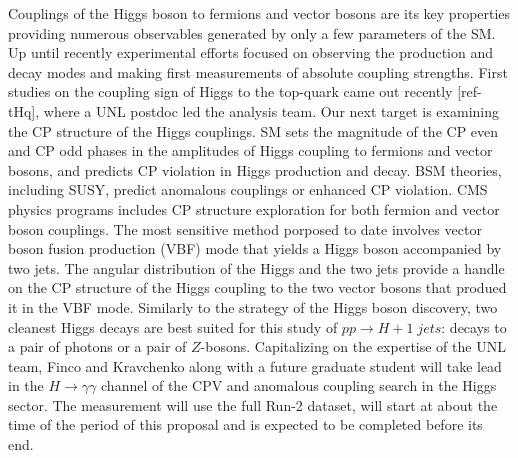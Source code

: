 Couplings of the Higgs boson to fermions and vector bosons are its key properties providing numerous observables generated by only a few parameters of the SM. Up until recently experimental efforts focused on observing the production and decay modes and making first measurements of absolute coupling strengths. First studies on the coupling sign of Higgs to the top-quark came out recently [ref-tHq], where a UNL postdoc led the analysis team. Our next target is examining the CP structure of the Higgs couplings. SM sets the magnitude of the CP even and CP odd phases in the amplitudes of Higgs coupling to fermions and vector bosons, and predicts CP violation in Higgs production and decay. BSM theories, including SUSY, predict anomalous couplings or enhanced CP violation. CMS physics programs includes CP structure exploration for both fermion and vector boson couplings. The most sensitive method porposed to date involves vector boson fusion production (VBF) mode that yields a Higgs boson accompanied by two jets. The angular distribution of the Higgs and the two jets provide a handle on the CP structure of the Higgs coupling to the two vector bosons that produed it in the VBF mode. Similarly to the strategy of the Higgs boson discovery, two cleanest Higgs decays are best suited for this study of $pp\to H+1\;jets$: decays to a pair of photons or a pair of $Z$-bosons. Capitalizing on the expertise of the UNL team, Finco and Kravchenko along with a future graduate student will take lead in the $H\to\gamma\gamma$ channel of the CPV and anomalous coupling search in the Higgs sector. The measurement will use the full Run-2 dataset, will start at about the time of the period of this proposal and is expected to be completed before its end.

